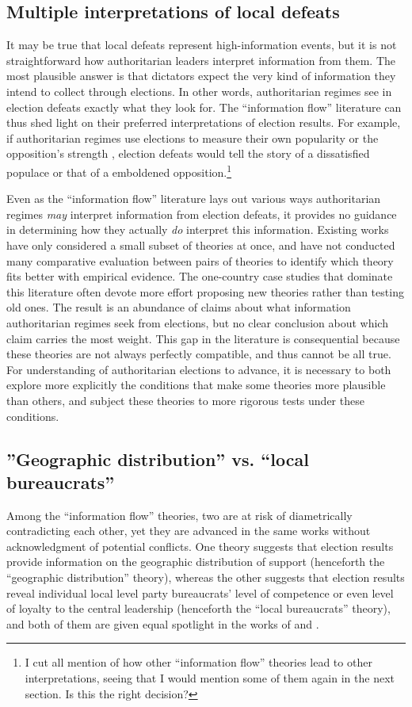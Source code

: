 \documentclass[12pt]{article}\usepackage[]{graphicx}\usepackage[]{color}
\newcommand{\1}{\mathbbm{1}}
\begin{document}
\subsection{Multiple interpretations of local defeats}
It may be true that local defeats represent high-information events, but it is not straightforward how authoritarian leaders interpret information from them. The most plausible answer is that dictators expect the very kind of information they intend to collect through elections. In other words, authoritarian regimes see in election defeats exactly what they look for. The ``information flow'' literature can thus shed light on their preferred interpretations of election results. For example, if authoritarian regimes use elections to measure their own popularity \citep{Miller2015} or the opposition's strength \citep{Geddes2005}, election defeats would tell the story of a dissatisfied populace or that of a emboldened opposition.\footnote{I cut all mention of how other ``information flow'' theories lead to other interpretations, seeing that I would mention some of them again in the next section. Is this the right decision?}

Even as the ``information flow'' literature lays out various ways authoritarian regimes \textit{may} interpret information from election defeats, it provides no guidance in determining how they actually \textit{do} interpret this information. Existing works have only considered a small subset of theories at once, and have not conducted many comparative evaluation between pairs of theories to identify which theory fits better with empirical evidence. The one-country case studies that dominate this literature \citep{LustOkar2005, Geddes2005, Magaloni2006, Blaydes2008} often devote more effort proposing new theories rather than testing old ones. The result is an abundance of claims about what information authoritarian regimes seek from elections, but no clear conclusion about which claim carries the most weight. This gap in the literature is consequential because these theories are not always perfectly compatible, and thus cannot be all true. For understanding of authoritarian elections to advance, it is necessary to both explore more explicitly the conditions that make some theories more plausible than others, and subject these theories to more rigorous tests under these conditions.

\subsection{''Geographic distribution'' vs. ``local bureaucrats''}
Among the ``information flow'' theories, two are at risk of diametrically contradicting each other, yet they are advanced in the same works without acknowledgment of potential conflicts. One theory suggests that election results provide information on the geographic distribution of support (henceforth the ``geographic distribution'' theory), whereas the other suggests that election results reveal individual local level party bureaucrats' level of competence or even level of loyalty to the central leadership (henceforth the ``local bureaucrats'' theory), and both of them are given equal spotlight in the works of \cite{Magaloni2006} and \cite{Blaydes2008}.
\end{document}

